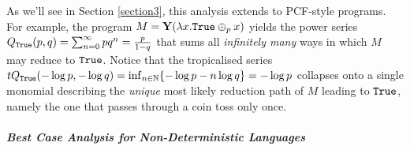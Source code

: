 As we'll see in Section \ref{section3}, this analysis extends to PCF-style programs. For example, the program $M=\mathbf Y(\lambda x.\mathtt{True} \oplus_{p} x)$ yields the power series $Q_{\mathtt{True}}(p,q)=\sum_{n=0}^{\infty}pq^{n}=\frac{p}{1-q}$ that sums all \emph{infinitely many} ways in which $M$ may reduce to $\mathtt{True}$. Notice that the tropicalised series $\mathsf tQ_{\true}(-\log p,-\log q)=\inf_{n\in \mathbb N}\{-\log p -n\log q\}=-\log p$ collapses onto a single monomial describing the \emph{unique} most likely reduction path of $M$ leading to $\mathtt{True}$, namely the one that passes through a coin toss only once. 
%


\subparagraph*{Best Case Analysis for Non-Deterministic Languages}

